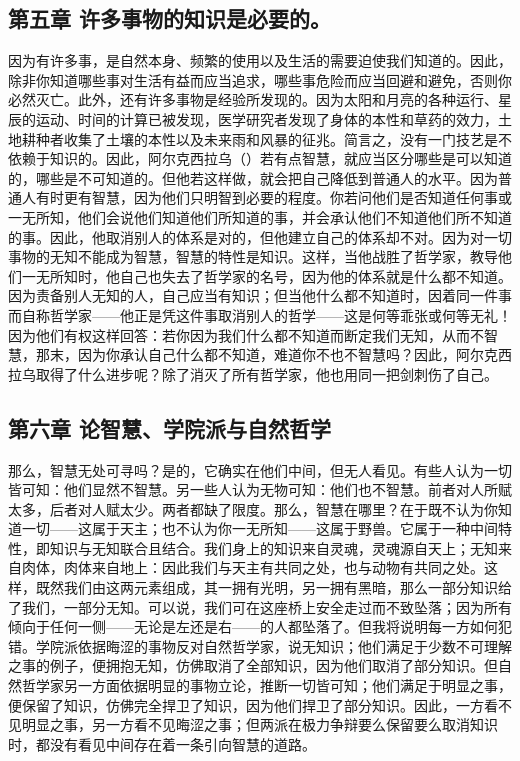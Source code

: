 
\subsection{第五章 许多事物的知识是必要的。}

因为有许多事，是自然本身、频繁的使用以及生活的需要迫使我们知道的。因此，除非你知道哪些事对生活有益而应当追求，哪些事危险而应当回避和避免，否则你必然灭亡。此外，还有许多事物是经验所发现的。因为太阳和月亮的各种运行、星辰的运动、时间的计算已被发现，医学研究者发现了身体的本性和草药的效力，土地耕种者收集了土壤的本性以及未来雨和风暴的征兆。简言之，没有一门技艺是不依赖于知识的。因此，阿尔克西拉乌（）若有点智慧，就应当区分哪些是可以知道的，哪些是不可知道的。但他若这样做，就会把自己降低到普通人的水平。因为普通人有时更有智慧，因为他们只明智到必要的程度。你若问他们是否知道任何事或一无所知，他们会说他们知道他们所知道的事，并会承认他们不知道他们所不知道的事。因此，他取消别人的体系是对的，但他建立自己的体系却不对。因为对一切事物的无知不能成为智慧，智慧的特性是知识。这样，当他战胜了哲学家，教导他们一无所知时，他自己也失去了哲学家的名号，因为他的体系就是什么都不知道。因为责备别人无知的人，自己应当有知识；但当他什么都不知道时，因着同一件事而自称哲学家——他正是凭这件事取消别人的哲学——这是何等乖张或何等无礼！因为他们有权这样回答：若你因为我们什么都不知道而断定我们无知，从而不智慧，那末，因为你承认自己什么都不知道，难道你不也不智慧吗？因此，阿尔克西拉乌取得了什么进步呢？除了消灭了所有哲学家，他也用同一把剑刺伤了自己。\par


\subsection{第六章  论智慧、学院派与自然哲学}

那么，智慧无处可寻吗？是的，它确实在他们中间，但无人看见。有些人认为一切皆可知：他们显然不智慧。另一些人认为无物可知：他们也不智慧。前者对人所赋太多，后者对人赋太少。两者都缺了限度。那么，智慧在哪里？在于既不认为你知道一切——这属于天主；也不认为你一无所知——这属于野兽。它属于一种中间特性，即知识与无知联合且结合。我们身上的知识来自灵魂，灵魂源自天上；无知来自肉体，肉体来自地上：因此我们与天主有共同之处，也与动物有共同之处。这样，既然我们由这两元素组成，其一拥有光明，另一拥有黑暗，那么一部分知识给了我们，一部分无知。可以说，我们可在这座桥上安全走过而不致坠落；因为所有倾向于任何一侧——无论是左还是右——的人都坠落了。但我将说明每一方如何犯错。学院派依据晦涩的事物反对自然哲学家，说无知识；他们满足于少数不可理解之事的例子，便拥抱无知，仿佛取消了全部知识，因为他们取消了部分知识。但自然哲学家另一方面依据明显的事物立论，推断一切皆可知；他们满足于明显之事，便保留了知识，仿佛完全捍卫了知识，因为他们捍卫了部分知识。因此，一方看不见明显之事，另一方看不见晦涩之事；但两派在极力争辩要么保留要么取消知识时，都没有看见中间存在着一条引向智慧的道路。\par

